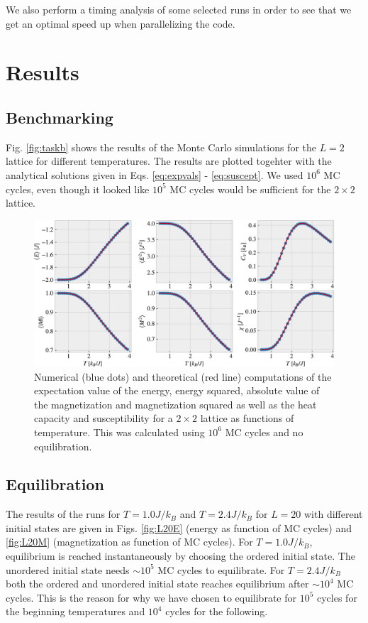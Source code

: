 \documentclass[%
 reprint,
nofootinbib,
aps,
]{revtex4-1}
\begin{document}
We also perform a timing analysis of some selected runs in order to see that we get an optimal speed up when parallelizing the code.

\section{Results}

\subsection{Benchmarking}
Fig. \vref{fig:taskb} shows the results of the Monte Carlo simulations for the $L = 2$ lattice for different temperatures. The results are plotted togehter with the analytical solutions given in Eqs. \eqref{eq:expvals} - \eqref{eq:suscept}. We used $10^6$ MC cycles, even though it looked like $10^5$ MC cycles would be sufficient for the $2 \times 2$ lattice.

\begin{figure}
\centering
\includegraphics[width=\textwidth]{../figures/taskb.pdf}
\caption{Numerical (blue dots) and theoretical (red line) computations of the expectation value of the energy, energy squared, absolute value of the magnetization and magnetization squared as well as the heat capacity and susceptibility for a $2\times 2$ lattice as functions of temperature. This was calculated using $10^6$ MC cycles and no equilibration.}
\label{fig:taskb}
\end{figure}


\subsection{Equilibration}

The results of the runs for $T = 1.0J/k_B$ and $T = 2.4J/k_B$ for $L = 20$ with different initial states are given in Figs. \ref{fig:L20E} (energy as function of MC cycles) and \vref{fig:L20M} (magnetization as function of MC cycles). For $T = 1.0J/k_B$, equilibrium is reached instantaneously by choosing the ordered initial state. The unordered initial state needs $\sim 10^5$ MC cycles to equilibrate. For $T = 2.4J/k_B$ both the ordered and unordered initial state reaches equilibrium after $\sim 10^4$ MC cycles. This is the reason for why we have chosen to equilibrate for $10^5$ cycles for the beginning temperatures and $10^4$ cycles for the following.
\end{document}

